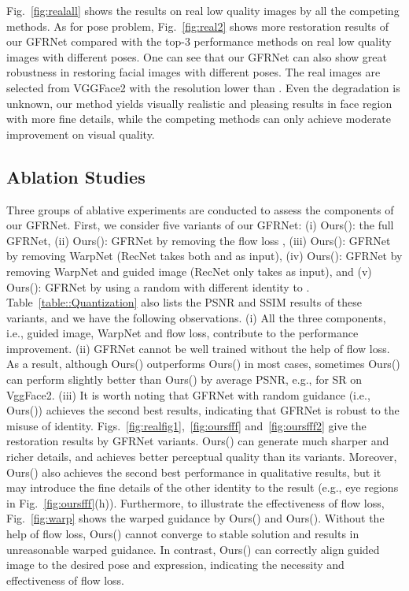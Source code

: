 \documentclass[runningheads]{llncs}
\begin{document}
Fig.~\ref{fig:realall} shows the results on real low quality images by all the competing methods. As for pose problem, Fig.~\ref{fig:real2} shows more restoration results of our GFRNet compared with the top-3 performance methods on real low quality images with different poses. One can see that our GFRNet can also show great robustness in restoring facial images with different poses.
The real images are selected from VGGFace2 with the resolution lower than .
Even the degradation is unknown, our method yields visually realistic and pleasing results in face region with more fine details, while the competing methods can only achieve moderate improvement on visual quality.

\subsection{Ablation Studies}
Three groups of ablative experiments are conducted to assess the components of our GFRNet.
First, we consider five variants of our GFRNet:
(i) Ours(): the full GFRNet,
(ii) Ours(): GFRNet by removing the flow loss ,
(iii) Ours(): GFRNet by removing WarpNet (RecNet takes both  and  as input),
(iv) Ours(): GFRNet by removing WarpNet and guided image (RecNet only takes  as input),
and (v) Ours(): GFRNet by using a random  with different identity to .
Table~\ref{table::Quantization} also lists the PSNR and SSIM results of these variants, and we have the following observations.
(i) All the three components, i.e., guided image, WarpNet and flow loss, contribute to the performance improvement.
(ii) GFRNet cannot be well trained without the help of flow loss.
As a result, although Ours() outperforms Ours() in most cases, sometimes Ours() can perform slightly better than Ours() by average PSNR, e.g., for  SR on VggFace2.
(iii) It is worth noting that GFRNet with random guidance (i.e., Ours()) achieves the second best results, indicating that GFRNet is robust to the misuse of identity.
Figs.~\ref{fig:realfig1},~\ref{fig:oursfff} and~\ref{fig:oursfff2} give the restoration results by GFRNet variants.
Ours() can generate much sharper and richer details, and achieves better perceptual quality than its variants.
Moreover, Ours() also achieves the second best performance in qualitative results, but it may introduce the fine details of the other identity to the result (e.g., eye regions in Fig.~\ref{fig:oursfff}(h)).
Furthermore, to illustrate the effectiveness of flow loss, Fig.~\ref{fig:warp} shows the warped guidance by Ours() and Ours().
Without the help of flow loss, Ours() cannot converge to stable solution and results in unreasonable warped guidance.
In contrast, Ours() can correctly align guided image to the desired pose and expression, indicating the necessity and effectiveness of flow loss.
\end{document}
